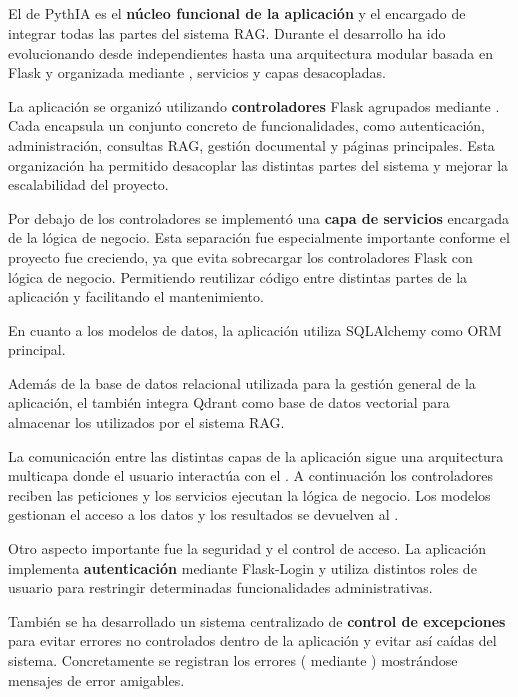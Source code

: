 \subsection{}

El  de PythIA es el \textbf{núcleo funcional de la aplicación} y el encargado de integrar todas las partes del sistema RAG. Durante el desarrollo ha ido evolucionando desde  independientes hasta una arquitectura modular basada en Flask  y organizada mediante , servicios y capas desacopladas.

La aplicación se organizó utilizando \textbf{controladores} Flask agrupados mediante . Cada  encapsula un conjunto concreto de funcionalidades, como autenticación, administración, consultas RAG, gestión documental y páginas principales. Esta organización ha permitido desacoplar las distintas partes del sistema y mejorar la escalabilidad del proyecto.

Por debajo de los controladores se implementó una \textbf{capa de servicios} encargada de la lógica de negocio. Esta separación fue especialmente importante conforme el proyecto fue creciendo, ya que evita sobrecargar los controladores Flask con lógica de negocio. Permitiendo reutilizar código entre distintas partes de la aplicación y facilitando el mantenimiento. 

En cuanto a los modelos de datos, la aplicación utiliza SQLAlchemy como ORM principal. 

Además de la base de datos relacional utilizada para la gestión general de la aplicación, el  también integra Qdrant como base de datos vectorial para almacenar los  utilizados por el sistema RAG.

La comunicación entre las distintas capas de la aplicación sigue una arquitectura multicapa donde el usuario interactúa con el . A continuación los controladores reciben las peticiones y los servicios ejecutan la lógica de negocio. Los modelos gestionan el acceso a los datos y los resultados se devuelven al .

Otro aspecto importante fue la seguridad y el control de acceso. La aplicación implementa \textbf{autenticación} mediante Flask-Login y utiliza distintos roles de usuario para restringir determinadas funcionalidades administrativas. 

También se ha desarrollado un sistema centralizado de \textbf{control de excepciones} para evitar errores no controlados dentro de la aplicación y evitar así caídas del sistema. Concretamente se registran los errores ( mediante ) mostrándose mensajes de error amigables.

